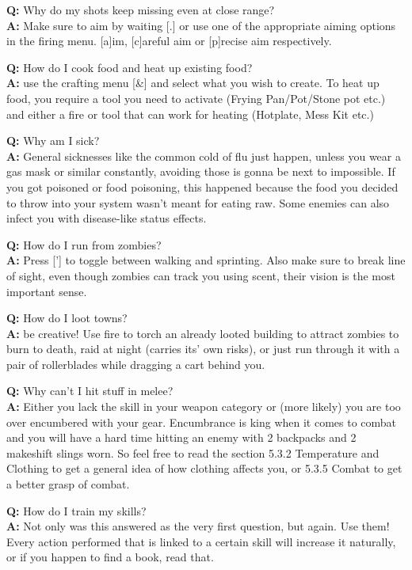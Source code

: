 \textbf{Q:} Why do my shots keep missing even at close range?\\
\textbf{A:} Make sure to aim by waiting [.] or use one of the appropriate aiming options in the firing menu. [a]im, [c]areful aim or [p]recise aim respectively.

\textbf{Q:} How do I cook food and heat up existing food?\\
\textbf{A:} use the crafting menu [\&] and select what you wish to create. To heat up food, you require a tool you need to activate (Frying Pan/Pot/Stone pot etc.) and either a fire or tool that can work for heating (Hotplate, Mess Kit etc.)

\textbf{Q:} Why am I sick?\\
\textbf{A:} General sicknesses like the common cold of flu just happen, unless you wear a gas mask or similar constantly, avoiding those is gonna be next to impossible. If you got poisoned or food poisoning, this happened because the food you decided to throw into your system wasn't meant for eating raw. Some enemies can also infect you with disease-like status effects.

\textbf{Q:} How do I run from zombies?\\
\textbf{A:} Press ['] to toggle between walking and sprinting. Also make sure to break line of sight, even though zombies can track you using scent, their vision is the most important sense.

\textbf{Q:} How do I loot towns?\\
\textbf{A:} be creative! Use fire to torch an already looted building to attract zombies to burn to death, raid at night (carries its' own risks), or just run through it with a pair of rollerblades while dragging a cart behind you.

\textbf{Q:} Why can't I hit stuff in melee?\\
\textbf{A:} Either you lack the skill in your weapon category or (more likely) you are too over encumbered with your gear. Encumbrance is king when it comes to combat and you will have a hard time hitting an enemy with 2 backpacks and 2 makeshift slings worn. So feel free to read the section 5.3.2 Temperature and Clothing to get a general idea of how clothing affects you, or 5.3.5 Combat to get a better grasp of combat.

\textbf{Q:} How do I train my skills?\\
\textbf{A:} Not only was this answered as the very first question, but again. Use them! Every action performed that is linked to a certain skill will increase it naturally, or if you happen to find a book, read that.

